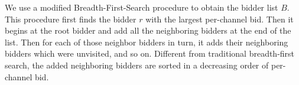 \documentclass{sig-alternate}
\begin{document}
We use a modified Breadth-First-Search procedure to obtain the bidder list $B$. This procedure first finds the bidder $r$ with the largest per-channel bid. Then it begins at the root bidder and add all the neighboring bidders at the end of the list. Then for each of those neighbor bidders in turn, it adds their neighboring bidders which were unvisited, and so on. Different from traditional breadth-first search, the added neighboring bidders are sorted in a decreasing order of per-channel bid. %


%
%
\end{document}
